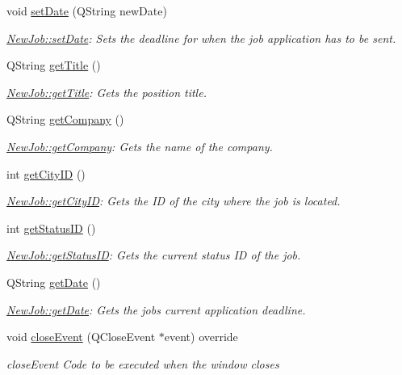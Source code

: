 \begin{DoxyCompactItemize}
void \hyperlink{class_new_job_a0a1d9067e72f797ad3b1f01d44fedb0f}{set\+Date} (Q\+String new\+Date)
\begin{DoxyCompactList}\small\item\em \hyperlink{class_new_job_a0a1d9067e72f797ad3b1f01d44fedb0f}{New\+Job\+::set\+Date}\+: Sets the deadline for when the job application has to be sent. \end{DoxyCompactList}\item 
Q\+String \hyperlink{class_new_job_aa93c07712d80644b828994a01993c27c}{get\+Title} ()
\begin{DoxyCompactList}\small\item\em \hyperlink{class_new_job_aa93c07712d80644b828994a01993c27c}{New\+Job\+::get\+Title}\+: Gets the position title. \end{DoxyCompactList}\item 
Q\+String \hyperlink{class_new_job_ad4680ae9c009b90ce751c3c5fe60cdb5}{get\+Company} ()
\begin{DoxyCompactList}\small\item\em \hyperlink{class_new_job_ad4680ae9c009b90ce751c3c5fe60cdb5}{New\+Job\+::get\+Company}\+: Gets the name of the company. \end{DoxyCompactList}\item 
int \hyperlink{class_new_job_aed4a9a6fa7eab69062c1d36afd58cd75}{get\+City\+ID} ()
\begin{DoxyCompactList}\small\item\em \hyperlink{class_new_job_aed4a9a6fa7eab69062c1d36afd58cd75}{New\+Job\+::get\+City\+ID}\+: Gets the ID of the city where the job is located. \end{DoxyCompactList}\item 
int \hyperlink{class_new_job_aebbe015a22f5dbf60a34c33dd5c5a8e7}{get\+Status\+ID} ()
\begin{DoxyCompactList}\small\item\em \hyperlink{class_new_job_aebbe015a22f5dbf60a34c33dd5c5a8e7}{New\+Job\+::get\+Status\+ID}\+: Gets the current status ID of the job. \end{DoxyCompactList}\item 
Q\+String \hyperlink{class_new_job_abe92b6bce4e8e3485f59554a2cbad1bc}{get\+Date} ()
\begin{DoxyCompactList}\small\item\em \hyperlink{class_new_job_abe92b6bce4e8e3485f59554a2cbad1bc}{New\+Job\+::get\+Date}\+: Gets the job\textquotesingle{}s current application deadline. \end{DoxyCompactList}\item 
void \hyperlink{class_new_job_a84f6390f63ce01fb860b375f53f9c68d}{close\+Event} (Q\+Close\+Event $\ast$event) override
\begin{DoxyCompactList}\small\item\em close\+Event Code to be executed when the window closes \end{DoxyCompactList}\end{DoxyCompactItemize}


